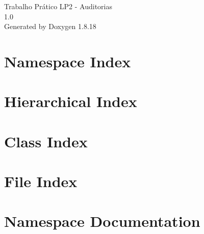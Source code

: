 \let\mypdfximage\pdfximage\def\pdfximage{\immediate\mypdfximage}\documentclass[twoside]{book}
\newcommand{\+}{\discretionary{\mbox{\scriptsize$\hookleftarrow$}}{}{}}
\newcommand{\clearemptydoublepage}{%
  \newpage{\pagestyle{empty}\cleardoublepage}%
}
\begin{document}
\hypersetup{pageanchor=false,
             bookmarksnumbered=true,
             pdfencoding=unicode
            }
\begin{titlepage}
\vspace*{7cm}
\begin{center}%
{\Large Trabalho Prático L\+P2 -\/ Auditorias \\[1ex]\large 1.\+0 }\\
\vspace*{1cm}
{\large Generated by Doxygen 1.8.18}\\
\end{center}
\end{titlepage}
\clearemptydoublepage
{}
\tableofcontents
\clearemptydoublepage
{}
\hypersetup{pageanchor=true}

\chapter{Namespace Index}

\chapter{Hierarchical Index}

\chapter{Class Index}

\chapter{File Index}

\chapter{Namespace Documentation}




\end{document}
